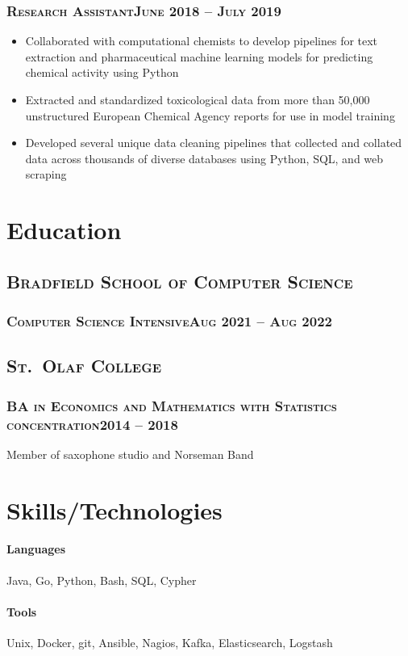 \documentclass{article}
\newcommand{\resumeSection}[1]{\section*{#1}}
\newcommand{\institution}[1]{\subsection*{\scshape{#1}}}
\newcommand{\jobPosition}[3]{\subsubsection*{\scshape{#1}\hfill #2 -- #3}}
\begin{document}
    \jobPosition{Research Assistant}{June 2018}{July 2019}
    \begin{itemize}[noitemsep]
      \item
            Collaborated with computational chemists to develop
            pipelines for text extraction and pharmaceutical machine
            learning models for predicting chemical activity using Python
      \item
            Extracted and standardized toxicological data from more
            than 50,000 unstructured European Chemical Agency reports
            for use in model training
      \item
            Developed several unique data cleaning pipelines that
            collected and collated data across thousands of diverse
            databases using Python, SQL, and web scraping
    \end{itemize}

\resumeSection{Education}
  \institution{Bradfield School of Computer Science}
    \jobPosition{Computer Science Intensive}{Aug 2021}{Aug 2022}

  \institution{St.\ Olaf College}
    \jobPosition{BA in Economics and Mathematics with Statistics concentration}{2014}{2018}
    Member of saxophone studio and Norseman Band

\resumeSection{Skills/Technologies}
  \paragraph{Languages}
    Java,
    Go,
    Python,
    Bash,
    SQL,
    Cypher
  \paragraph{Tools}
    Unix,
    Docker,
    git,
    Ansible,
    Nagios,
    Kafka,
    Elasticsearch,
    Logstash
\end{document}
